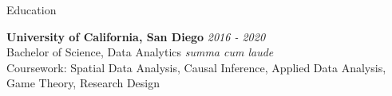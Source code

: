 \documentclass[10pt]{resume} %
\begin{document}
	
	
	\begin{rSection}{Education}
		
		{\bf University of California, San Diego} \hfill {\em 2016 - 2020} 
		\\ Bachelor of Science, Data Analytics \hfill {\em summa cum laude}
		\\ Coursework: Spatial Data Analysis, Causal Inference, Applied Data Analysis, Game Theory, Research Design
		
	\end{rSection}
	
	
\end{document}
